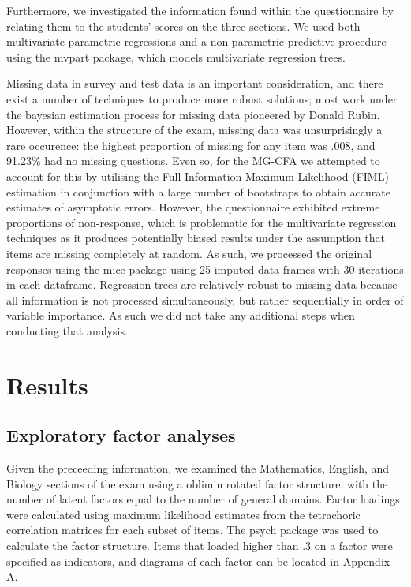 \documentclass{article}\usepackage[]{graphicx}\usepackage[]{color}
\begin{document}
Furthermore, we investigated the information found within the questionnaire by relating them to the students' scores on the three sections. We used both multivariate parametric regressions and a non-parametric predictive procedure using the mvpart package, which models multivariate regression trees.

Missing data in survey and test data is an important consideration, and there exist a number of techniques to produce more robust solutions; most work under the bayesian estimation process for missing data pioneered by Donald Rubin\cite{rubin}. However, within the structure of the exam, missing data was unsurprisingly a rare occurence: the highest proportion of missing for any item was .008, and 91.23\% had no missing questions. Even so, for the MG-CFA we attempted to account for this by utilising the Full Information Maximum Likelihood (FIML) estimation in conjunction with a large number of bootstraps to obtain accurate estimates of asymptotic errors. However, the questionnaire exhibited extreme proportions of non-response, which is problematic for the multivariate regression techniques as it produces potentially biased results under the assumption that items are missing completely at random. As such, we processed the original responses using the mice package\cite{mice} using 25 imputed data frames with 30 iterations in each dataframe. Regression trees are relatively robust to missing data because all information is not processed simultaneously, but rather sequentially in order of variable importance. As such we did not take any additional steps when conducting that analysis.
\section{Results}
\subsection{Exploratory factor analyses}
Given the preceeding information, we examined the Mathematics, English, and Biology sections of the exam using a oblimin rotated factor structure, with the number of latent factors equal to the number of general domains. Factor loadings were calculated using maximum likelihood estimates from the tetrachoric correlation matrices for each subset of items. The psych package was used to calculate the factor structure. Items that loaded higher than .3 on a factor were specified as indicators, and diagrams of each factor can be located in Appendix A.
\end{document}
